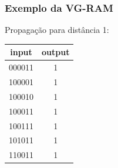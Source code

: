 \documentclass{beamer}
\begin{document}
\begin{frame}
    \frametitle{Exemplo da VG-RAM}
    Propagação para distância 1:
    \begin{table}
        \centering
        \begin{tabular}{|c|c|}
            \hline
            input &   output\\
            \hline
            000011 & \alert 1\\
            \hline
            100001 & \alert 1\\
            \hline
            100010 & \alert 1\\
            \hline
            100011 &        1\\
            \hline
            100111 & \alert 1\\
            \hline
            101011 & \alert 1\\
            \hline
            110011 & \alert 1\\
            \hline
        \end{tabular}
    \end{table}
\end{frame}
\end{document}
